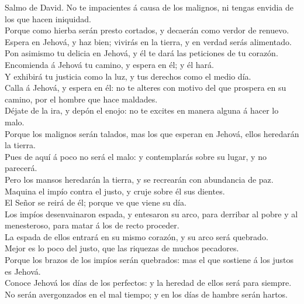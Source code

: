  Salmo de David. No te impacientes á causa de los
malignos, ni tengas envidia de los que hacen iniquidad.\\
 Porque como hierba serán presto cortados, y decaerán como
verdor de renuevo.\\
 Espera en Jehová, y haz bien; vivirás en la tierra, y en
verdad serás alimentado.\\
 Pon asimismo tu delicia en Jehová, y él te dará las
peticiones de tu corazón.\\
 Encomienda á Jehová tu camino, y espera en él; y él
hará.\\
 Y exhibirá tu justicia como la luz, y tus derechos como
el medio día.\\
 Calla á Jehová, y espera en él: no te alteres con motivo
del que prospera en su camino, por el hombre que hace maldades.\\
 Déjate de la ira, y depón el enojo: no te excites en
manera alguna á hacer lo malo.\\
 Porque los malignos serán talados, mas los que esperan en
Jehová, ellos heredarán la tierra.\\
 Pues de aquí á poco no será el malo: y contemplarás
sobre su lugar, y no parecerá.\\
 Pero los mansos heredarán la tierra, y se recrearán con
abundancia de paz.\\
 Maquina el impío contra el justo, y cruje sobre él sus
dientes.\\
 El Señor se reirá de él; porque ve que viene su día.\\
 Los impíos desenvainaron espada, y entesaron su arco,
para derribar al pobre y al menesteroso, para matar á los de recto
proceder.\\
 La espada de ellos entrará en su mismo corazón, y su
arco será quebrado.\\
 Mejor es lo poco del justo, que las riquezas de muchos
pecadores.\\
 Porque los brazos de los impíos serán quebrados: mas el
que sostiene á los justos es Jehová.\\
 Conoce Jehová los días de los perfectos: y la heredad de
ellos será para siempre.\\
 No serán avergonzados en el mal tiempo; y en los días de
hambre serán hartos.\\
